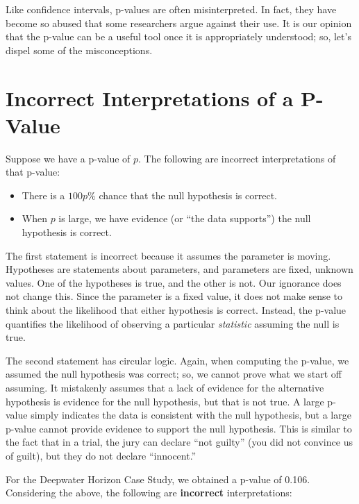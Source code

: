 \documentclass[
  letterpaper,
  DIV=11,
  numbers=noendperiod]{scrreprt}
\providecommand{\tightlist}{%
  \setlength{\itemsep}{0pt}\setlength{\parskip}{0pt}}\usepackage{longtable,booktabs,array}
\theoremstyle{plain}
\theoremstyle{definition}
\theoremstyle{definition}
\theoremstyle{remark}
\begin{document}
Like confidence intervals, p-values are often misinterpreted. In fact,
they have become so abused that some researchers argue against their
use. It is our opinion that the p-value can be a useful tool once it is
appropriately understood; so, let's dispel some of the misconceptions.

\hypertarget{incorrect-interpretations-of-a-p-value}{%
\section{Incorrect Interpretations of a
P-Value}\label{incorrect-interpretations-of-a-p-value}}

Suppose we have a p-value of \(p\). The following are incorrect
interpretations of that p-value:

\begin{itemize}
\tightlist
\item
  There is a \(100p\)\% chance that the null hypothesis is correct.
\item
  When \(p\) is large, we have evidence (or ``the data supports'') the
  null hypothesis is correct.
\end{itemize}

The first statement is incorrect because it assumes the parameter is
moving. Hypotheses are statements about parameters, and parameters are
fixed, unknown values. One of the hypotheses is true, and the other is
not. Our ignorance does not change this. Since the parameter is a fixed
value, it does not make sense to think about the likelihood that either
hypothesis is correct. Instead, the p-value quantifies the likelihood of
observing a particular \emph{statistic} assuming the null is true.

The second statement has circular logic. Again, when computing the
p-value, we assumed the null hypothesis was correct; so, we cannot prove
what we start off assuming. It mistakenly assumes that a lack of
evidence for the alternative hypothesis is evidence for the null
hypothesis, but that is not true. A large p-value simply indicates the
data is consistent with the null hypothesis, but a large p-value cannot
provide evidence to support the null hypothesis. This is similar to the
fact that in a trial, the jury can declare ``not guilty'' (you did not
convince us of guilt), but they do not declare ``innocent.''

For the Deepwater Horizon Case Study, we obtained a p-value of 0.106.
Considering the above, the following are \textbf{incorrect}
interpretations:
\end{document}
